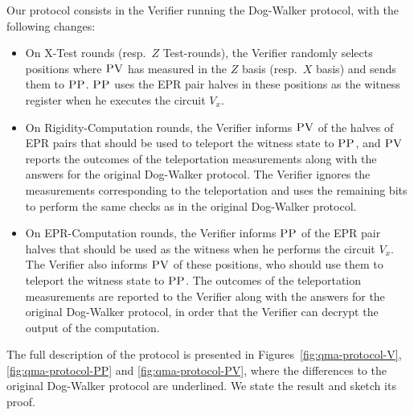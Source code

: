 Our protocol consists in the Verifier running the Dog-Walker protocol,
  with the following changes:
  \begin{itemize}
    \item On X-Test rounds (resp.\ $Z$ Test-rounds), the Verifier randomly selects  positions where
      $\textsc{PV}$ has measured in the $Z$ basis (resp.\ $X$ basis) and sends them to $\textsc{PP}$. $\textsc{PP}$ uses the EPR pair halves in these positions as the witness register when he executes the circuit $V_x$.
    \item On Rigidity-Computation rounds, the Verifier
      informs $\textsc{PV}$ of the halves of EPR pairs that should be used to teleport the witness
      state to $\textsc{PP}$, and $\textsc{PV}$ reports the outcomes of the teleportation
      measurements along with the answers for the original Dog-Walker protocol. The Verifier ignores the measurements corresponding to the teleportation and uses the remaining bits to perform the same checks as in the original Dog-Walker protocol.
      \item On EPR-Computation rounds, the Verifier informs $\textsc{PP}$ of the
      EPR pair halves that should be used as the witness when he performs the circuit $V_x$.  
      The Verifier
      also informs $\textsc{PV}$ of these positions, who should use them to teleport the witness
      state to $\textsc{PP}$.  The outcomes of the teleportation      measurements are reported to the Verifier along with the answers for the original Dog-Walker protocol, in order that the Verifier can decrypt the output of the computation.
  \end{itemize}

The full description of the protocol is presented in Figures~\ref{fig:qma-protocol-V}, \ref{fig:qma-protocol-PP} and \ref{fig:qma-protocol-PV}, where the differences to the original Dog-Walker protocol are underlined. We state the result and sketch its proof. 


